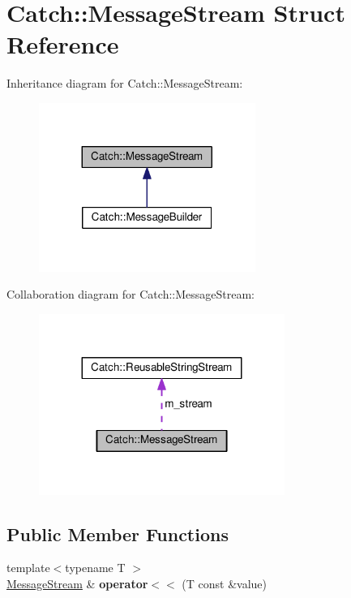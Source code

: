 \hypertarget{structCatch_1_1MessageStream}{}\section{Catch\+:\+:Message\+Stream Struct Reference}
\label{structCatch_1_1MessageStream}


Inheritance diagram for Catch\+:\+:Message\+Stream\+:\nopagebreak
\begin{figure}[H]
\begin{center}
\leavevmode
\includegraphics[width=200pt]{structCatch_1_1MessageStream__inherit__graph}
\end{center}
\end{figure}


Collaboration diagram for Catch\+:\+:Message\+Stream\+:\nopagebreak
\begin{figure}[H]
\begin{center}
\leavevmode
\includegraphics[width=227pt]{structCatch_1_1MessageStream__coll__graph}
\end{center}
\end{figure}
\subsection*{Public Member Functions}
\begin{DoxyCompactItemize}
\item 
{\footnotesize template$<$typename T $>$ }\\\hyperlink{structCatch_1_1MessageStream}{Message\+Stream} \& {\bfseries operator$<$$<$} (T const \&value)\hypertarget{structCatch_1_1MessageStream_a554c4aff5925a077e9fe9d858217428d}{}\label{structCatch_1_1MessageStream_a554c4aff5925a077e9fe9d858217428d}

\end{DoxyCompactItemize}
